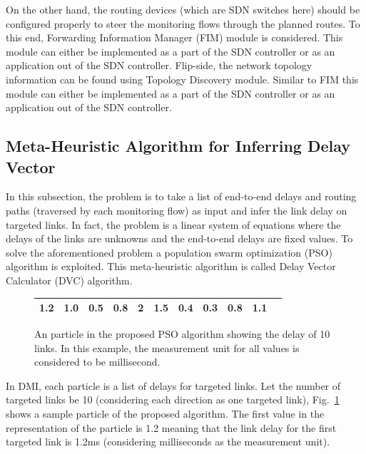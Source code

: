 \documentclass[10pt, journal, letterpaper]{IEEEtran}
\begin{document}
On the other hand, the routing devices (which are SDN switches here) should be configured properly to steer the monitoring flows through the planned routes. To this end, Forwarding Information Manager (FIM) module is considered. This module can either be implemented as a part of the SDN controller or as an application out of the SDN controller. Flip-side, the network topology information can be found using Topology Discovery module. Similar to FIM this module can either be implemented as a part of the SDN controller or as an application out of the SDN controller.

\subsection{Meta-Heuristic Algorithm for Inferring Delay Vector}\label{subsec:pso}
In this subsection, the problem is to take a list of end-to-end delays and routing paths (traversed by each monitoring flow) as input and infer the link delay on targeted links. In fact, the problem is a linear system of equations where the delays of the links are unknowns and the end-to-end delays are fixed values. To solve the aforementioned problem a population swarm optimization (PSO) algorithm is exploited. This meta-heuristic algorithm is called Delay Vector Calculator (DVC) algorithm. 
\begin{figure}
	\begin{center}
		\begin{tabular}{|c|c|c|c|c|c|c|c|c|c|c|}\hline
			1.2 & 1.0 & 0.5 & 0.8 & 2 & 1.5 & 0.4 & 0.3 & 0.8 & 1.1\\\hline
		\end{tabular}
		\caption{An particle in the proposed PSO algorithm showing the delay of 10 links. In this example, the measurement unit for all values is considered to be millisecond.}
		\label{fig:particle}
	\end{center}%
\end{figure}
In DMI, each particle is a list of delays for targeted links. Let the number of targeted links be 10 (considering each direction as one targeted link), Fig.~\ref{fig:particle} shows a sample particle of the proposed algorithm. The first value in the representation of the particle is 1.2 meaning that the link delay for the first targeted link is 1.2ms (considering milliseconds as the measurement unit).
\end{document}
